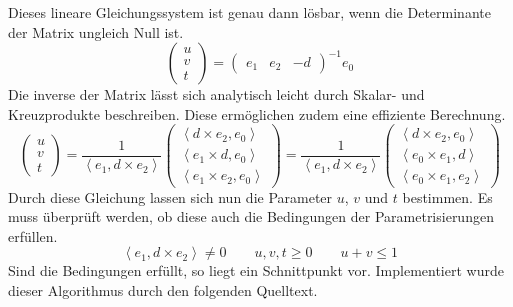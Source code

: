 \documentclass[crop=false]{standalone}
\begin{document}
      Dieses lineare Gleichungssystem ist genau dann lösbar, wenn die Determinante der Matrix ungleich Null ist.
      \[
        \begin{pmatrix}
          u \\
          v \\
          t
        \end{pmatrix}
        =
        \begin{pmatrix}
          e_1 &
          e_2 &
          -d
        \end{pmatrix}^{-1}
        e_0
      \]
      Die inverse der Matrix lässt sich analytisch leicht durch Skalar- und Kreuzprodukte beschreiben.
      Diese ermöglichen zudem eine effiziente Berechnung.
      \[
        \begin{pmatrix}
          u \\
          v \\
          t
        \end{pmatrix}
        =
        \frac{1}{\left\langle e_1, d\times e_2  \right\rangle}
        \begin{pmatrix}
          \left\langle d\times e_2 , e_0 \right\rangle \\
          \left\langle e_1\times d , e_0 \right\rangle \\
          \left\langle e_1\times e_2, e_0 \right\rangle
        \end{pmatrix}
        =
        \frac{1}{\left\langle e_1, d\times e_2  \right\rangle}
        \begin{pmatrix}
          \left\langle d\times e_2 , e_0 \right\rangle \\
          \left\langle e_0\times e_1 , d \right\rangle \\
          \left\langle e_0\times e_1, e_2 \right\rangle
        \end{pmatrix}
      \]
      Durch diese Gleichung lassen sich nun die Parameter $u$, $v$ und $t$ bestimmen.
      Es muss überprüft werden, ob diese auch die Bedingungen der Parametrisierungen erfüllen.
      \[
        \left\langle e_1, d\times e_2  \right\rangle \neq 0
        \qquad
        u,v,t \geq 0
        \qquad
        u+v\leq 1
      \]
      Sind die Bedingungen erfüllt, so liegt ein Schnittpunkt vor.
      Implementiert wurde dieser Algorithmus durch den folgenden Quelltext.

\end{document}
